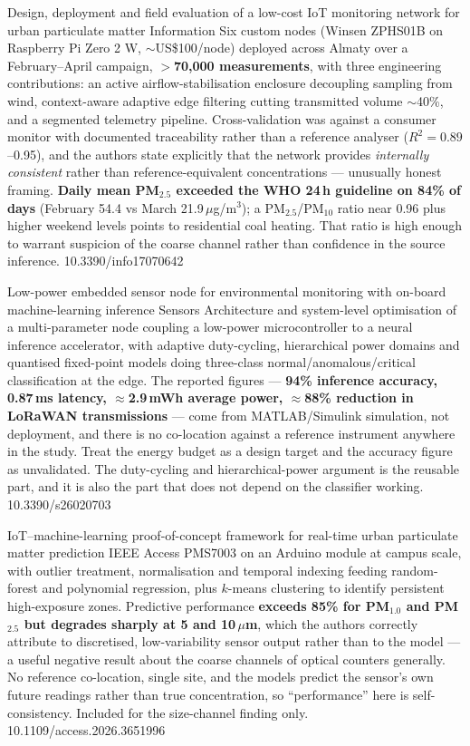 \documentclass[10pt]{article}
\begin{document}
{Design, deployment and field evaluation of a low-cost IoT monitoring network for urban
particulate matter}
{Information}
{Six custom nodes (Winsen ZPHS01B on Raspberry Pi Zero 2 W, $\sim$US\$100/node) deployed
across Almaty over a February--April campaign, \textbf{$>$70{,}000 measurements}, with
three engineering contributions: an active airflow-stabilisation enclosure decoupling
sampling from wind, context-aware adaptive edge filtering cutting transmitted volume
$\sim$40\%, and a segmented telemetry pipeline. Cross-validation was against a consumer
monitor with documented traceability rather than a reference analyser
($R^2 = 0.89$--0.95), and the authors state explicitly that the network provides
\emph{internally consistent} rather than reference-equivalent concentrations --- unusually
honest framing. \textbf{Daily mean PM$_{2.5}$ exceeded the WHO 24\,h guideline on 84\% of
days} (February 54.4 vs March 21.9\,$\mu$g/m$^3$); a PM$_{2.5}$/PM$_{10}$ ratio near 0.96
plus higher weekend levels points to residential coal heating. That ratio is high enough
to warrant suspicion of the coarse channel rather than confidence in the source
inference.}
{10.3390/info17070642}


{Low-power embedded sensor node for environmental monitoring with on-board
machine-learning inference}
{Sensors}
{Architecture and system-level optimisation of a multi-parameter node coupling a
low-power microcontroller to a neural inference accelerator, with adaptive duty-cycling,
hierarchical power domains and quantised fixed-point models doing three-class
normal/anomalous/critical classification at the edge. The reported figures ---
\textbf{94\% inference accuracy, 0.87\,ms latency, $\approx$2.9\,mWh average power,
$\approx$88\% reduction in LoRaWAN transmissions} --- come from MATLAB/Simulink
simulation, not deployment, and there is no co-location against a reference instrument
anywhere in the study. Treat the energy budget as a design target and the accuracy figure
as unvalidated. The duty-cycling and hierarchical-power argument is the reusable part,
and it is also the part that does not depend on the classifier working.}
{10.3390/s26020703}

{IoT--machine-learning proof-of-concept framework for real-time urban particulate matter
prediction}
{IEEE Access}
{PMS7003 on an Arduino module at campus scale, with outlier treatment, normalisation and
temporal indexing feeding random-forest and polynomial regression, plus $k$-means
clustering to identify persistent high-exposure zones. Predictive performance
\textbf{exceeds 85\% for PM$_{1.0}$ and PM$_{2.5}$ but degrades sharply at 5 and
10\,$\mu$m}, which the authors correctly attribute to discretised, low-variability sensor
output rather than to the model --- a useful negative result about the coarse channels of
optical counters generally. No reference co-location, single site, and the models predict
the sensor's own future readings rather than true concentration, so ``performance'' here
is self-consistency. Included for the size-channel finding only.}
{10.1109/access.2026.3651996}
\end{document}
